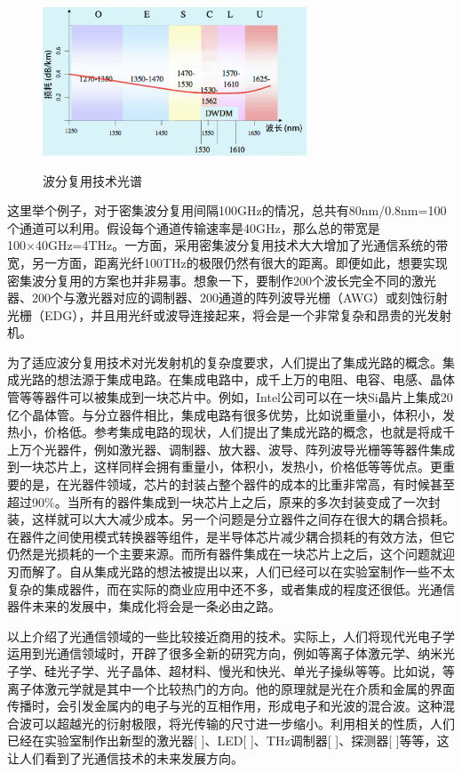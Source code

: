 \documentclass{ZJUthesis}
\begin{document}
\begin{figure}[!ht]
  \centering
  \includegraphics[width=0.7\textwidth]{./Pictures/wdm.eps}\\
  \caption{波分复用技术光谱}
  \label{fig_wdm}
\end{figure}

这里举个例子，对于密集波分复用间隔100GHz的情况，总共有80nm/0.8nm=100个通道可以利用。假设每个通道传输速率是40GHz，那么总的带宽是100×40GHz=4THz。一方面，采用密集波分复用技术大大增加了光通信系统的带宽，另一方面，距离光纤100THz的极限仍然有很大的距离。即便如此，想要实现密集波分复用的方案也并非易事。想象一下，要制作200个波长完全不同的激光器、200个与激光器对应的调制器、200通道的阵列波导光栅（AWG）或刻蚀衍射光栅（EDG），并且用光纤或波导连接起来，将会是一个非常复杂和昂贵的光发射机。

为了适应波分复用技术对光发射机的复杂度要求，人们提出了集成光路的概念。集成光路的想法源于集成电路。在集成电路中，成千上万的电阻、电容、电感、晶体管等等器件可以被集成到一块芯片中。例如，Intel公司可以在一块Si晶片上集成20亿个晶体管。与分立器件相比，集成电路有很多优势，比如说重量小，体积小，发热小，价格低。参考集成电路的现状，人们提出了集成光路的概念，也就是将成千上万个光器件，例如激光器、调制器、放大器、波导、阵列波导光栅等等器件集成到一块芯片上，这样同样会拥有重量小，体积小，发热小，价格低等等优点。更重要的是，在光器件领域，芯片的封装占整个器件的成本的比重非常高，有时候甚至超过90\%。当所有的器件集成到一块芯片上之后，原来的多次封装变成了一次封装，这样就可以大大减少成本。另一个问题是分立器件之间存在很大的耦合损耗。在器件之间使用模式转换器等组件，是半导体芯片减少耦合损耗的有效方法，但它仍然是光损耗的一个主要来源。而所有器件集成在一块芯片上之后，这个问题就迎刃而解了。自从集成光路的想法被提出以来，人们已经可以在实验室制作一些不太复杂的集成器件，而在实际的商业应用中还不多，或者集成的程度还很低。光通信器件未来的发展中，集成化将会是一条必由之路。

以上介绍了光通信领域的一些比较接近商用的技术。实际上，人们将现代光电子学运用到光通信领域时，开辟了很多全新的研究方向，例如等离子体激元学、纳米光子学、硅光子学、光子晶体、超材料、慢光和快光、单光子操纵等等。比如说，等离子体激元学就是其中一个比较热门的方向。他的原理就是光在介质和金属的界面传播时，会引发金属内的电子与光的互相作用，形成电子和光波的混合波。这种混合波可以超越光的衍射极限，将光传输的尺寸进一步缩小。利用相关的性质，人们已经在实验室制作出新型的激光器[ ]、LED[ ]、THz调制器[ ]、探测器[ ]等等，这让人们看到了光通信技术的未来发展方向。
\end{document}
